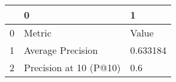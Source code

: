 \begin{tabular}{lll}
\toprule
{} &                       0 &         1 \\
\midrule
0 &                  Metric &     Value \\
1 &       Average Precision &  0.633184 \\
2 &  Precision at 10 (P@10) &       0.6 \\
\bottomrule
\end{tabular}
